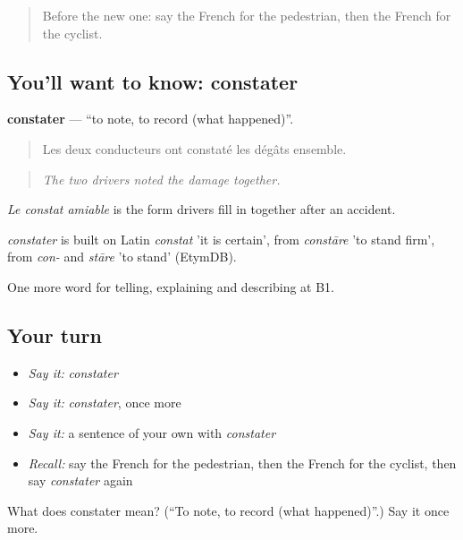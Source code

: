 \label{lesson:FR-C411-constater}



\begin{quote}
Before the new one: say the French for the pedestrian, then the French for the cyclist.
\end{quote}

\subsection*{You'll want to know: constater}
\textbf{constater} — \textquotedblleft{}to note, to record (what happened)\textquotedblright{}.

\begin{quote}
Les deux conducteurs ont constaté les dégâts ensemble.
\end{quote}

\begin{quote}
\emph{The two drivers noted the damage together.}
\end{quote}

\emph{Le constat amiable} is the form drivers fill in together after an accident.

\begin{cousinweb}
\emph{constater} is built on Latin \emph{constat} 'it is certain', from \emph{constāre} 'to stand firm', from \emph{con-} and \emph{stāre} 'to stand' (EtymDB).
\end{cousinweb}

\begin{grammarlens}[title={What you've built}]
One more word for telling, explaining and describing at B1.
\end{grammarlens}

\subsection*{Your turn}
\begin{itemize}
\raggedright
  \item \emph{Say it:} \emph{constater}
  \item \emph{Say it:} \emph{constater}, once more
  \item \emph{Say it:} a sentence of your own with \emph{constater}
  \item \emph{Recall:} say the French for the pedestrian, then the French for the cyclist, then say \emph{constater} again
\end{itemize}

\begin{tcolorbox}[breakable,colback=teal!4,colframe=teal!35!black,title={Before you move on}]
What does constater mean? (\textquotedblleft{}To note, to record (what happened)\textquotedblright{}.) Say it once more.
\end{tcolorbox}
